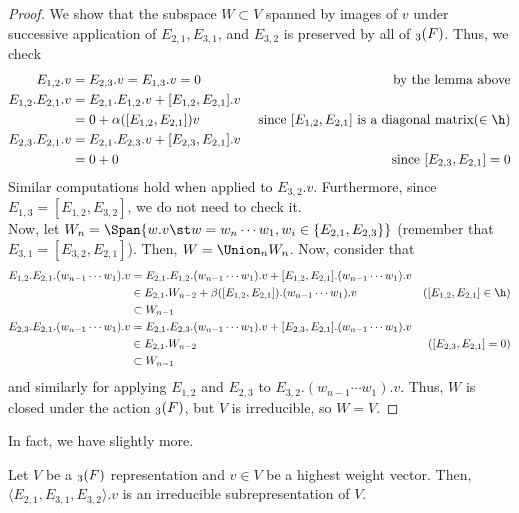 \documentclass[11pt,leqno,oneside]{amsart}
\numberwithin{thm}{section}
\begin{document}
\begin{proof}
  We show that the subspace \(W \subset V\) spanned by images of \(v\)
  under successive application of \(E_{2,1}, E_{3,1}\), and
  \(E_{3,2}\) is preserved by all of \(\sl_3(F)\). Thus, we check
  \begin{align*}
    E_{1,2}.v & = E_{2,3}.v = E_{1,3}.v = 0
    & \text{ by the lemma above} \\
    E_{1,2}.E_{2,1}.v
              & = E_{2,1}.E_{1,2}.v + [E_{1,2},E_{2,1}].v \\
              & = 0 + \alpha([E_{1,2},E_{2,1}])v
    & \text{ since }[E_{1,2},E_{2,1}]\text{ is a diagonal matrix} (\in
      \h) \\
    E_{2,3}.E_{2,1}.v & = E_{2,1}.E_{2,3}.v + [E_{2,3},E_{2,1}].v \\
              & = 0 + 0
                & \text{ since }[E_{2,3},E_{2,1}] = 0
  \end{align*}
  Similar computations hold when applied to
  \(E_{3,2}.v\). Furthermore, since \(E_{1,3} = [E_{1,2},E_{3,2}]\),
  we do not need to check it. \\

  Now, let \(W_n = \Span\{w.v \st w = w_n \cdots w_1, w_i \in
  \{E_{2,1},E_{2,3}\}\}\) (remember that \(E_{3,1} =
  [E_{3,2},E_{2,1}]\)). Then, \(W = \Union_n W_n\). Now, consider that
  \begin{align*}
    E_{1,2}.E_{2,1}.(w_{n-1}\cdots w_1).v
    & = E_{2,1}.E_{1,2}.(w_{n-1} \cdots w_1).v +
      [E_{1,2},E_{2,1}].(w_{n-1} \cdots w_1).v \\
    & \in E_{2,1}.W_{n-2} + \beta([E_{1,2},E_{2,1}]).(w_{n-1}\cdots
      w_1).v & ([E_{1,2},E_{2,1}] \in \h) \\
    & \subset W_{n-1} \\
    E_{2,3}.E_{2,1}.(w_{n-1}\cdots w_1).v
    & = E_{2,1}.E_{2,3}.(w_{n-1}\cdots w_1).v +
      [E_{2,3},E_{2,1}].(w_{n-1}\cdots w_1).v\\
    & \in E_{2,1}.W_{n-2} & ([E_{2,3},E_{2,1}] = 0) \\
    & \subset W_{n-1}
  \end{align*}
  and similarly for applying \(E_{1,2}\) and \(E_{2,3}\) to
  \(E_{3,2}.(w_{n-1} \cdots w_1).v\). Thus, \(W\) is closed under the
  action \(\sl_3(F)\), but \(V\) is irreducible, so \(W = V\).
\end{proof}
In fact, we have slightly more.
\begin{prop}
  Let \(V\) be a \(\sl_3(F)\) representation and \(v \in
  V\) be a highest weight vector. Then, \(\langle E_{2,1}, E_{3,1},
  E_{3,2} \rangle.v\) is an irreducible subrepresentation of \(V\).
\end{prop}
\end{document}
